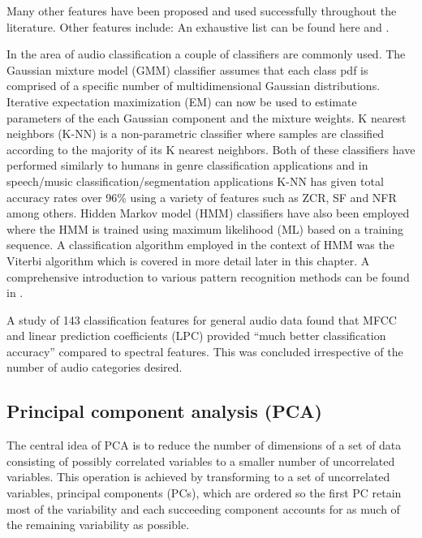 Many other features have been proposed and used successfully throughout the literature. Other features include: An exhaustive list can be found here \cite{Scheirer1997} and \cite{Gouyon2000}.



In the area of audio classification a couple of classifiers are commonly used. The Gaussian mixture model (GMM) classifier assumes that each class pdf is comprised of a specific number of multidimensional Gaussian distributions. Iterative expectation maximization (EM) can now be used to estimate parameters of the each Gaussian component and the mixture weights\cite{Tzanetakis2002}. K nearest neighbors (K-NN) is a non-parametric classifier where samples are classified according to the majority of its K nearest neighbors\cite{Lu2001}. Both of these classifiers have performed similarly to humans in genre classification applications\cite{Tzanetakis2002} and in speech/music classification/segmentation applications K-NN has given total accuracy rates over 96\% using a variety of features such as ZCR, SF and NFR among others\cite{Lu2002}. Hidden Markov model (HMM) classifiers have also been employed where the HMM is trained using maximum likelihood (ML) based on a training sequence\cite{Kimber1997}\cite{Xiong2003}\cite{Burke2013}. A classification algorithm employed in the context of HMM was the Viterbi algorithm which is covered in more detail later in this chapter\cite{Kimber1997}\cite{Burke2013}.
A comprehensive introduction to various pattern recognition methods can be found in \cite{Duda2001}.

A study of 143 classification features for general audio data found that MFCC and linear prediction coefficients (LPC) provided ``much better classification accuracy'' compared to spectral features\cite{Li2001}. This was concluded irrespective of the number of audio categories desired. 

\subsection{Principal component analysis (PCA)}
The central idea of PCA is to reduce the number of dimensions of a set of data consisting of possibly correlated variables to a smaller number of uncorrelated variables. This operation is achieved by transforming to a set of uncorrelated variables, principal components (PCs), which are ordered so the first PC retain most of the variability and each succeeding component accounts for as much of the remaining variability as possible.

